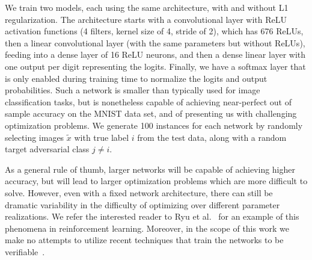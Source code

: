 \documentclass[smallextended]{svjour3}
\newcommand{\blue}[1]{{#1}}
\begin{document}

\blue{We train two models, each using the same architecture, with and without L1 regularization. The architecture starts with a convolutional layer with ReLU activation functions (4 filters, kernel size of 4, stride of 2), which has 676 ReLUs, then a linear convolutional layer (with the same parameters but without ReLUs), feeding into a dense layer of 16 ReLU neurons, and then a dense linear layer with one output per digit representing the logits. Finally, we have a softmax layer that is only enabled during training time to normalize the logits and output probabilities.} \blue{Such a network is smaller than typically used for image classification tasks, but is nonetheless capable of achieving near-perfect out of sample accuracy on the MNIST data set, and of presenting us with challenging optimization problems.} We generate 100 instances for each network by randomly selecting images $\tilde{x}$ with true label $i$ from the test data, along with a random target adversarial class $j \neq i$. 

\blue{As a general rule of thumb, larger networks will be capable of achieving higher accuracy, but will lead to larger optimization problems which are more difficult to solve. However, even with a fixed network architecture, there can still be dramatic variability in the difficulty of optimizing over different parameter realizations. We refer the interested reader to Ryu et al.~\cite{Ryu:2019} for an example of this phenomena in reinforcement learning. Moreover, in the scope of this work} we make no attempts to utilize recent techniques that train the networks to be verifiable~\cite{Dvijotham:2018,Wong:2017,Wong:2018,Xiao:2018}.
\end{document}
